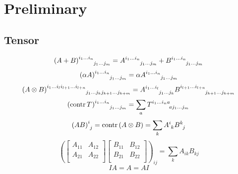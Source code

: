 \documentclass[../main.tex]{subfiles}
\begin{document}
\section{Preliminary}
\subsection{Tensor}
\begin{equation}\label{Tensor:Sum}
\tensor{\left(A+B\right)}{
^{i_1}^{\dots}^{i_n}
_{j_1}_{\dots}_{j_m}
}
=
\tensor{A}{
^{i_1}^{\dots}^{i_n}
_{j_1}_{\dots}_{j_m}
}
+
\tensor{B}{
^{i_1}^{\dots}^{i_n}
_{j_1}_{\dots}_{j_m}
}
\end{equation}
\begin{equation}\label{Tensor:Product:Scalar}
\tensor{\left(\alpha A\right)}{
^{i_1}^{\dots}^{i_n}
_{j_1}_{\dots}_{j_m}
}
=
\alpha
\tensor{A}{
^{i_1}^{\dots}^{i_n}
_{j_1}_{\dots}_{j_m}
}
\end{equation}
\begin{equation}\label{Tensor:Product:Tensor}
\tensor{\left(A\otimes B\right)}{
^{i_1}^{\dots}^{i_l}^{i_{l+1}}^{\dots}^{i_{l+n}}
_{j_1}_{\dots}_{j_k}_{j_{k+1}}_{\dots}_{j_{k+m}}
}
=
\tensor{A}{
^{i_1}^{\dots}^{i_l}
_{j_1}_{\dots}_{j_k}
}
\tensor{B}{
^{i_{l+1}}^{\dots}^{i_{l+n}}
_{j_{k+1}}_{\dots}_{j_{k+m}}
}
\end{equation}
\begin{equation}\label{Tensor:Contraction}
\tensor{\left(\contr{\tensor{T}{}}\right)}{
^{i_1}^{\dots}^{i_n}
_{j_1}_{\dots}_{j_m}
}
=
\sum_a{\tensor{T}{
^{i_1}^{\dots}^{i_n}^a
_a_{j_1}_{\dots}_{j_m}
}}
\end{equation}
\begin{equation}\label{Matrix:Product}
\tensor{\left(AB\right)}{^i_j}
=\contr{\left(A\otimes B\right)}
=\sum_k\tensor{A}{^i_k}\tensor{B}{^k_j}
\end{equation}
\begin{equation}\label{Matrix:Product:Block}
\left(\begin{bmatrix}
A_{11}&A_{12} \\
A_{21}&A_{22} \\
\end{bmatrix}
\begin{bmatrix}
B_{11}&B_{12} \\
B_{21}&B_{22} \\
\end{bmatrix}\right)_{ij}
=
\sum_k A_{ik} B_{kj}
\end{equation}
\begin{equation}\label{Matrix:Identity}
IA = A = AI
\end{equation}
\end{document}
